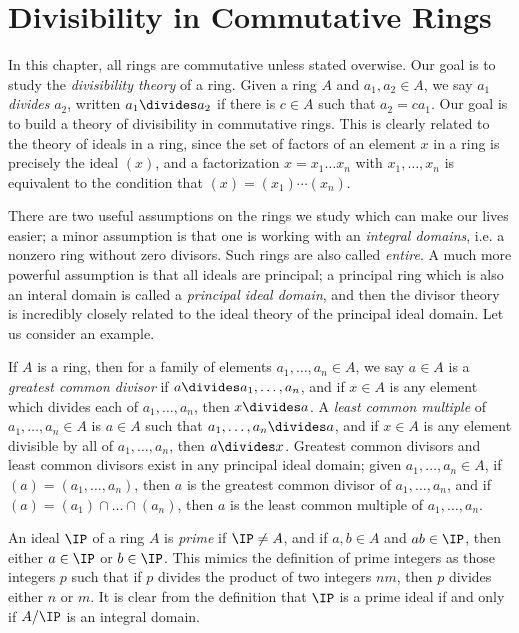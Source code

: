 \chapter{Divisibility in Commutative Rings}

In this chapter, all rings are commutative unless stated overwise. Our goal is to study the \emph{divisibility theory} of a ring. Given a ring $A$ and $a_1,a_2 \in A$, we say $a_1$ \emph{divides} $a_2$, written $a_1 \divides a_2$ if there is $c \in A$ such that $a_2 = ca_1$. Our goal is to build a theory of divisibility in commutative rings. This is clearly related to the theory of ideals in a ring, since the set of factors of an element $x$ in a ring is precisely the ideal $(x)$, and a factorization $x = x_1 \dots x_n$ with $x_1, \dots, x_n$ is equivalent to the condition that $(x) = (x_1) \cdots (x_n)$.

There are two useful assumptions on the rings we study which can make our lives easier; a minor assumption is that one is working with an \emph{integral domains}, i.e. a nonzero ring without zero divisors. Such rings are also called \emph{entire}. A much more powerful assumption is that all ideals are principal; a principal ring which is also an interal domain is called a \emph{principal ideal domain}, and then the divisor theory is incredibly closely related to the ideal theory of the principal ideal domain. Let us consider an example.

\begin{example}
    If $A$ is a ring, then for a family of elements $a_1, \dots, a_n \in A$, we say $a \in A$ is a \emph{greatest common divisor} if $a \divides a_1, \dots, a_n$, and if $x \in A$ is any element which divides each of $a_1, \dots, a_n$, then $x \divides a$. A \emph{least common multiple} of $a_1, \dots, a_n \in A$ is $a \in A$ such that $a_1, \dots, a_n \divides a$, and if $x \in A$ is any element divisible by all of $a_1, \dots, a_n$, then $a \divides x$. Greatest common divisors and least common divisors exist in any principal ideal domain; given $a_1, \dots, a_n \in A$, if $(a) = (a_1, \dots, a_n)$, then $a$ is the greatest common divisor of $a_1, \dots, a_n$, and if $(a) = (a_1) \cap \dots \cap (a_n)$, then $a$ is the least common multiple of $a_1, \dots, a_n$.
\end{example}

An ideal $\IP$ of a ring $A$ is \emph{prime} if $\IP \neq A$, and if $a,b \in A$ and $ab \in \IP$, then either $a \in \IP$ or $b \in \IP$. This mimics the definition of prime integers as those integers $p$ such that if $p$ divides the product of two integers $nm$, then $p$ divides either $n$ or $m$. It is clear from the definition that $\IP$ is a prime ideal if and only if $A/\IP$ is an integral domain.

